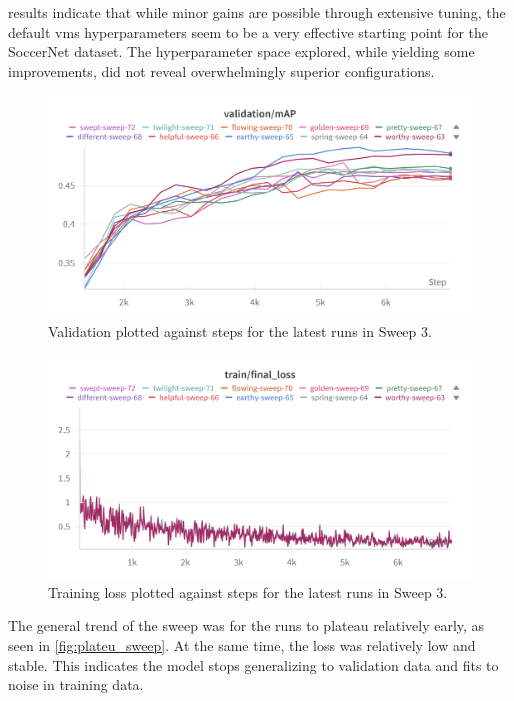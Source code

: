 
results indicate that while minor gains are possible through extensive tuning, the default \acrshort{vms} hyperparameters seem to be a very effective starting point for the SoccerNet dataset. The hyperparameter space explored, while yielding some improvements, did not reveal overwhelmingly superior configurations.


\begin{figure}
    \centering
    \includegraphics[width=0.75\linewidth]{figures/plateu_sweep.png}
    \caption{Validation plotted against steps for the latest runs in Sweep 3. }
    \label{fig:plateu_sweep}
\end{figure}
\begin{figure}
    \centering
    \includegraphics[width=0.75\linewidth]{figures/plateu_loss.png}
    \caption{Training loss plotted against steps for the latest runs in Sweep 3.}
    \label{fig:plateu_loss}
\end{figure}
The general trend of the sweep was for the runs to plateau relatively early, as seen in \autoref{fig:plateu_sweep}. At the same time, the loss was relatively low and stable. This indicates the model stops generalizing to validation data and fits to noise in training data.

